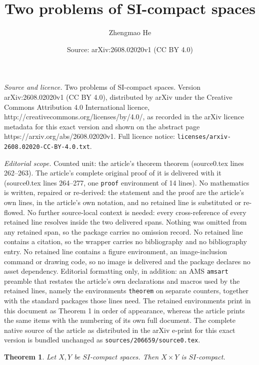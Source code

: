 \documentclass[10pt,a4paper]{amsart}
\title{Two problems of SI-compact spaces}
\author{Zhengmao He}
\date{Source: arXiv:2608.02020v1 (CC BY 4.0)}
\newtheorem{theorem}{Theorem}
\begin{document}
\maketitle

\noindent\emph{Source and licence.} Two problems of SI-compact spaces. Version arXiv:2608.02020v1 (CC BY 4.0), distributed by arXiv under the Creative Commons Attribution 4.0 International licence, http://creativecommons.org/licenses/by/4.0/, as recorded in the arXiv licence metadata for this exact version and shown on the abstract page https://arxiv.org/abs/2608.02020v1. Full licence notice: \texttt{licenses/arxiv-2608.02020-CC-BY-4.0.txt}.\par\smallskip

\noindent\textit{Editorial scope.} Counted unit: the article's theorem theorem (source0.tex lines 262--263). The article's complete original proof of it is delivered with it (source0.tex lines 264--277, one \texttt{proof} environment of 14 lines). No mathematics is written, repaired or re-derived: the statement and the proof are the article's own lines, in the article's own notation, and no retained line is substituted or re-flowed.  No further source-local context is needed: every cross-reference of every retained line resolves inside the two delivered spans.  Nothing was omitted from any retained span, so the package carries no omission record.  No retained line contains a citation, so the wrapper carries no bibliography and no bibliography entry.  No retained line contains a figure environment, an image-inclusion command or drawing code, so no image is delivered and the package declares no asset dependency.  Editorial formatting only, in addition: an AMS \texttt{amsart} preamble that restates the article's own declarations and macros used by the retained lines, namely the environments \texttt{theorem} on separate counters, together with the standard packages those lines need.  The retained environments print in this document as Theorem 1 in order of appearance, whereas the article prints the same items with the numbering of its own full document.  The complete native source of the article as distributed in the arXiv e-print for this exact version is bundled unchanged as \texttt{sources/206659/source0.tex}.
\begin{theorem}{\rm Let $X,Y$ be $SI$-compact spaces. Then $X\times Y$ is $SI$-compact.}
\end{theorem}
\end{document}
